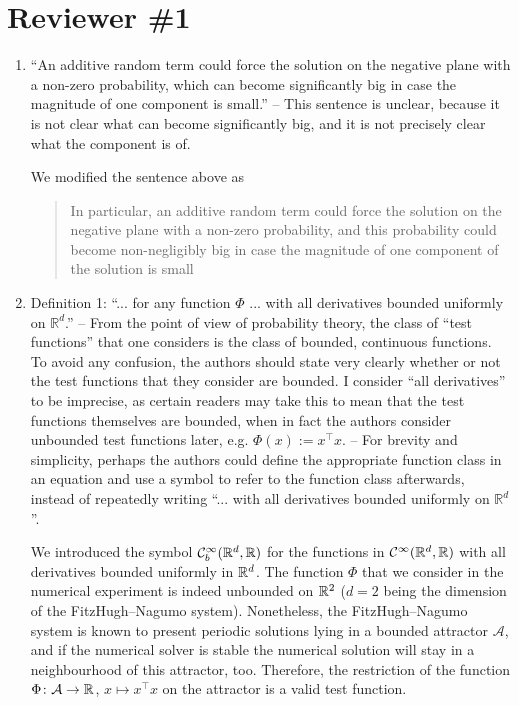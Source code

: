 \documentclass[10pt]{article}
\begin{document}
\section{Reviewer \#1} 
\begin{enumerate}
	\item 
	\begin{itquote} 
		``An additive random term could force the solution on the negative plane with a non-zero probability, which can become significantly big in case the magnitude of one component is small.'' -- This sentence is unclear, because it is not clear what can become significantly big, and it is not precisely clear what the component is of.
	\end{itquote}
	We modified the sentence above as 
	\begin{quote} In particular, an additive random term could force the solution on the negative plane with a non-zero probability, and this probability could become non-negligibly big in case the magnitude of one component of the solution is small \end{quote}
	\item 
	\begin{itquote} 
		Definition 1: ``... for any function $\Phi$ ... with all derivatives bounded uniformly on $\mathbb{R}^d$.'' -- From the point of view of probability theory, the class of ``test functions'' that one considers is the class of bounded, continuous functions. To avoid any confusion, the authors should state very clearly whether or not the test functions that they consider are bounded. I consider ``all derivatives'' to be imprecise, as certain readers may take this to mean that the test functions themselves are bounded, when in fact the authors consider unbounded test functions later, e.g. $\Phi(x):=x^\top x$. -- For brevity and simplicity, perhaps the authors could define the appropriate function class in an equation and use a symbol to refer to the function class afterwards, instead of repeatedly writing ``... with all derivatives bounded uniformly on $\mathbb{R}^d$''.
	\end{itquote}
	We introduced the symbol $\mathcal C^\infty_b(\mathbb{R}^d, \mathbb{R})$ for the functions in $\mathcal C^\infty(\mathbb{R}^d, \mathbb{R})$ with all derivatives bounded uniformly in $\mathbb{R}^d$. The function $\Phi$ that we consider in the numerical experiment is indeed unbounded on $\mathbb{R}^2$ ($d = 2$ being the dimension of the FitzHugh--Nagumo system). Nonetheless, the FitzHugh--Nagumo system is known to present periodic solutions lying in a bounded attractor $\mathcal A$, and if the numerical solver is stable the numerical solution will stay in a neighbourhood of this attractor, too. Therefore, the restriction of the function $\Phi\colon \mathcal A \to \mathbb{R}$, $x \mapsto x^\top x$ on the attractor is a valid test function.

\end{enumerate}
\end{document}
